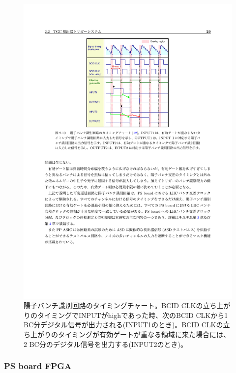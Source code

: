     \begin{figure} 
    \centering
    \includegraphics[width=14cm]{fig/Intro/TGC_BCID.pdf}
    \caption[陽子バンチ識別回路のタイミングチャート]{陽子バンチ識別回路のタイミングチャート\cite{mt_takemoto}。BCID CLKの立ち上がりのタイミングでINPUTがhighであった時、次のBCID CLKから1 BC分デジタル信号が出力される(INPUT1のとき)。BCID CLKの立ち上がりのタイミングが有効ゲートが重なる領域に来た場合には、2 BC分のデジタル信号を出力する(INPUT2のとき)。}
    \label{TGC_BCID}
    \end{figure}

    \subsubsection*{PS board FPGA}

